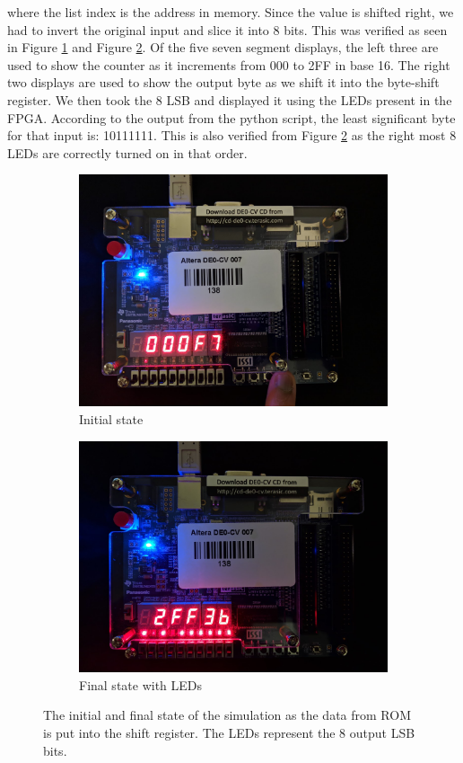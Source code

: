 \documentclass[letterpaper, 12pt]{article} %
\begin{document}
where the list index is the address in memory. Since the value is shifted right, we had to invert the original input and slice it into 8 bits.
This was verified as seen in Figure \ref{fpga1} and Figure \ref{fpga2}. Of the five seven segment displays, the left three are used to show the counter as it increments from 000 to 2FF in base 16. The right two displays are used to show the output byte as we shift it into the byte-shift register. We then took the 8 LSB and displayed it using the LEDs present in the FPGA. According to the output from the python script, the least significant byte for that input is: 10111111. This is also verified from Figure \ref{fpga2} as the right most 8 LEDs are correctly turned on in that order.\par
\begin{figure}[ht]
\centering
\begin{subfigure}{.5\textwidth}
  \centering
  \includegraphics[width=0.99\linewidth]{files/add_zero}
  \caption{Initial state}
  \label{fpga1}
\end{subfigure}%
\begin{subfigure}{.5\textwidth}
  \centering
  \includegraphics[width=0.99\linewidth]{files/add_2ff}
  \caption{Final state with LEDs}
  \label{fpga2}
\end{subfigure}
\caption{The initial and final state of the simulation as the data from ROM is put into the shift register. The LEDs represent the 8 output LSB bits.}
\label{fig:init}
\end{figure}
\end{document}
